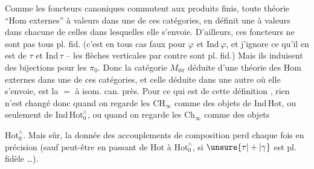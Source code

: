 Comme les foncteurs canoniques
commutent aux produits finis, toute théorie  ``Hom externes'' à valeurs dans une de ces catégories, en définit une à valeurs dans chacune de celles dans lesquelles elle s'envoie.
 D'ailleurs, ces foncteurs  ne sont pas tous pl. fid. (c'est en tous cas faux pour $\varphi$ et $\mathrm{Ind}\,\varphi$, et j'ignore ce qu'il en est de $\tau$ et $\mathrm{Ind}\,\tau$ -- les flèches verticales par contre sont pl. fid.)
Mais ils induisent des bijections pour les $\pi_0$. Donc la catégorie $M_{0\pi}$ déduite d'une théorie des Hom externes  dans une de ces catégories, et celle déduite dans une autre où elle s'envoie, est la $=$ à isom. can. près. 
Pour ce qui est de cette définition , rien n'est changé donc quand on regarde les $\mathrm{CH}_{\infty}$ comme des objets de $\mathrm{Ind}\,\mathrm{Hot}$, ou seulement de $\mathrm{Ind}\,\mathrm{Hot}_0^{\wedge}$, ou quand on regarde les $\mathrm{Ch}_{\infty}$ comme des objets

  $\mathrm{Hot}_0^{\wedge}$. Mais  sûr, la donnée des accouplements de composition perd chaque fois en précision (sauf peut-être en passant de $\mathrm{Hot}$ à $\mathrm{Hot}_0^{\wedge}$, si $\unsure{\tau|+|\gamma}$ est pl. fidèle \ldots).


